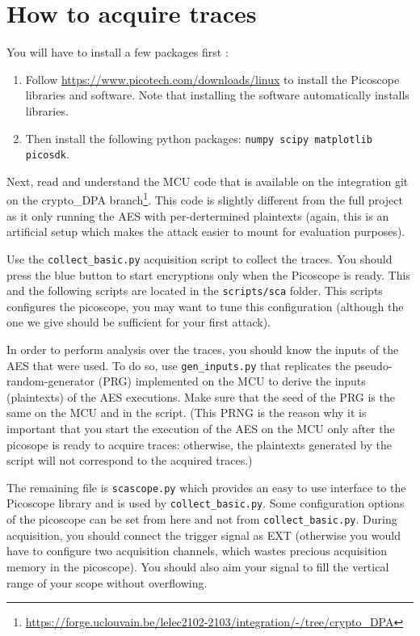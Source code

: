 \section{How to acquire traces}
You will have to install a few packages first :
\begin{enumerate}
\item Follow \url{https://www.picotech.com/downloads/linux} to install the Picoscope libraries and software. Note that installing the software automatically installs libraries.
    \item Then install the following python packages: \texttt{numpy scipy matplotlib picosdk}.
\end{enumerate}

Next, read and understand the MCU code that is available on the integration git on the crypto\_DPA branch\footnote{\url{https://forge.uclouvain.be/lelec2102-2103/integration/-/tree/crypto_DPA}}. This code is slightly different from the full project as it only running the AES with per-dertermined plaintexts (again, this is an artificial setup which makes the attack easier to mount for evaluation purposes).

Use the \texttt{collect\_basic.py} acquisition script to collect the traces. You should press the blue button to start encryptions only when the Picoscope is ready. This and the following scripts are located in the \texttt{scripts/sca} folder. This scripts configures the picoscope, you may want to tune this configuration (although the one we give should be sufficient for your first attack).

In order to perform analysis over the traces, you should know the inputs of the AES that were used. To do so, use \texttt{gen\_inputs.py} that replicates the pseudo-random-generator (PRG) implemented on the MCU to derive the inputs (plaintexts) of the AES executions. Make sure that the seed of the PRG is the same on the MCU and in the script. (This PRNG is the reason why it is important that you start the execution of the AES on the MCU only after the picosope is ready to acquire traces: otherwise, the plaintexts generated by the script will not correspond to the acquired traces.)

The remaining file is \texttt{scascope.py} which provides an easy to use interface to the Picoscope library and is used by \texttt{collect\_basic.py}. Some configuration options of the picoscope can be set from here and not from \texttt{collect\_basic.py}.
During acquisition, you should connect the trigger signal as EXT (otherwise you would have to configure two acquisition channels, which wastes precious acquisition memory in the picoscope). You should also aim your signal to fill the vertical range of your scope without overflowing.

